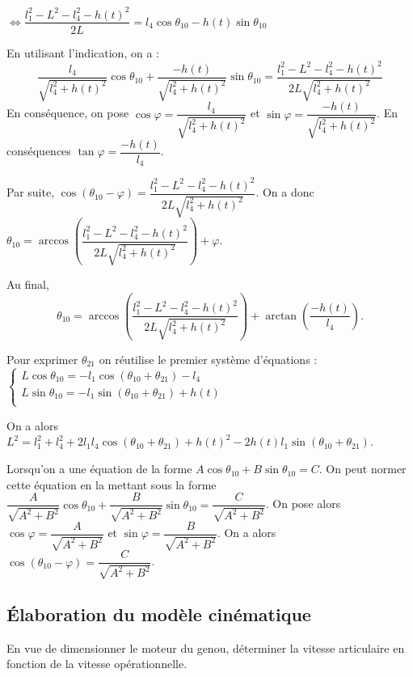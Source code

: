 \documentclass[10pt,fleqn]{article} %
\begin{document}
\begin{multicols}{2}
\begin{corrige}
$
\Leftrightarrow 
\dfrac{l_1^2 - L^2-l_4^2 -h(t)^2}{2L}=l_4\cos\theta_{10} -h(t)\sin\theta_{10}
$

En utilisant l'indication, on a : 
$$
\dfrac{l_4}{\sqrt{l_4^2 + h(t)^2}}\cos\theta_{10} +\dfrac{-h(t)}{\sqrt{l_4^2 + h(t)^2}}\sin\theta_{10}=\dfrac{l_1^2 - L^2-l_4^2 -h(t)^2}{2L{\sqrt{l_4^2 + h(t)^2}}}
$$
En conséquence, on pose $\cos\varphi=\dfrac{l_4}{\sqrt{l_4^2 + h(t)^2}}$ et 
$\sin\varphi = \dfrac{-h(t)}{\sqrt{l_4^2 + h(t)^2}}$. 
En conséquences %
$\tan\varphi =\dfrac{-h(t)}{l_4}$.


Par suite, $\cos\left( \theta_{10} - \varphi \right) =\dfrac{l_1^2 - L^2-l_4^2 -h(t)^2}{2L{\sqrt{l_4^2 + h(t)^2}}}$. On a donc 
$\theta_{10} =\arccos \left( \dfrac{l_1^2 - L^2-l_4^2 -h(t)^2}{2L{\sqrt{l_4^2 + h(t)^2}}}\right) + \varphi$.


Au final, 
$$\theta_{10} =\arccos \left( \dfrac{l_1^2 - L^2-l_4^2 -h(t)^2}{2L{\sqrt{l_4^2 + h(t)^2}}}\right) + \arctan\left(\dfrac{-h(t)}{l_4} \right).$$

Pour exprimer  $\theta_{21}$ on réutilise le premier système d'équations :
$
\left\{
\begin{array}{l}
L\cos\theta_{10} = - l_1\cos\left(\theta_{10}+\theta_{21}\right)-l_4 \\
L\sin\theta_{10} = - l_1\sin\left(\theta_{10}+\theta_{21}\right)+h(t) \\
\end{array}
\right.
$

On a alors 
$L^2 = l_1^2+l_4^2 +2 l_1l_4\cos\left(\theta_{10}+\theta_{21}\right)+h(t)^2-2h(t)l_1\sin\left(\theta_{10}+\theta_{21}\right)$.


\end{corrige}


\else
\fi


\begin{methode}
Lorsqu'on a une équation de la forme $A\cos\theta_{10}+B\sin\theta_{10}=C$. On peut normer cette équation en la mettant sous la forme $\dfrac{A}{\sqrt{A^2+B^2}}\cos\theta_{10}+\dfrac{B}{\sqrt{A^2+B^2}}\sin\theta_{10}=\dfrac{C}{\sqrt{A^2+B^2}}$.
On pose alors $\cos\varphi = \dfrac{A}{\sqrt{A^2+B^2}}$ et $\sin\varphi=\dfrac{B}{\sqrt{A^2+B^2}}$. On a alors $\cos\left( \theta_{10} - \varphi \right)=\dfrac{C}{\sqrt{A^2+B^2}}$.
\end{methode}


\subsection*{Élaboration du modèle cinématique}
\begin{obj}
En vue de dimensionner le moteur du genou, déterminer la vitesse articulaire en fonction de la  vitesse opérationnelle.
\end{obj}


\end{multicols}
\end{document}
